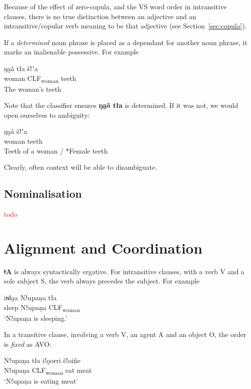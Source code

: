 \documentclass[11pt,a5paper]{book}
\newcommand{\qcn}[1]{\textcolor{AccentText}{\large\textbf{#1}}}
\newcommand{\langname}{\qcn{ǂA}}
\newcommand{\grammsc}[1]{\textsc{#1}}
\newcommand{\CLF}[1]{\grammsc{CLF}\textsubscript{#1}}
\newcommand{\cmnt}[1]{\textcolor{red}{#1}}
\begin{document}
Because of the effect of zero-copula, and the VS word order in intransitive clauses, there is no true distinction between an adjective and an intransitive/copular verb meaning to be that adjective (see Section~\ref{sec:copula}).

If a \emph{determined} noun phrase is placed as a dependant for another noun phrase, it marks an inalienable possessive. For example

\begin{exe}
\ex
\gll ŋa̰ã tła šǃʼa\\
woman \CLF{woman} teeth\\
\glt The woman's teeth
\end{exe}

Note that the classifier ensures \qcn{ŋa̰ã tła} is determined. If it was not, we would open ourselves to ambiguity:

\begin{exe}
\ex
\gll ŋa̰ã šǃʼa\\
woman teeth\\
\glt Teeth of a woman / *Female teeth
\end{exe}

Clearly, often context will be able to disambiguate. 

\subsection{Nominalisation}

\cmnt{todo}

\section{Alignment and Coordination}

\langname{} is always syntactically ergative. For intransitive clauses, with a verb V and a sole subject S, the verb always precedes the subject. For example

\begin{exe}
	\ex
	\gll iɴǁa̰a Nǃupaṇa tła \\
	sleep Nǃupaṇa \CLF{woman}\\
	\glt `Nǃupaṇa is sleeping.'
\end{exe}

In a transitive clause, involving a verb V, an agent A and an object O, the order is \emph{fixed} as AVO:

\begin{exe}
	\ex
	\gll Nǃupaṇa 	tła 	iǃo̰orri 	šǃoiñe \\
		Nǃupaṇa 	\CLF{woman} 	eat 	meat\\
	\glt `Nǃupaṇa is eating meat'
\end{exe}
\end{document}
